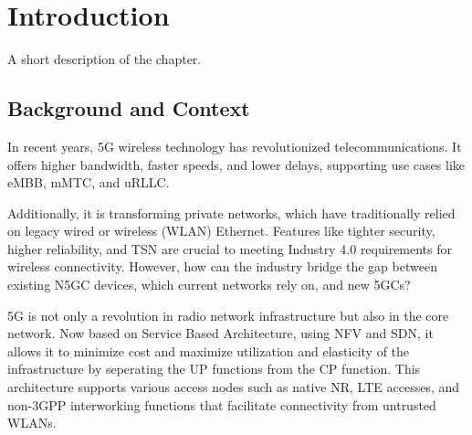 \chapter{Introduction}%
\label{chapter:introduction}

\begin{introduction}
A short description of the chapter.
\end{introduction}

\section{Background and Context}


In recent years, \ac{5G} wireless technology has revolutionized telecommunications. It offers higher bandwidth, faster speeds, and lower delays, supporting use cases like \ac{eMBB}, \ac{mMTC}, and \ac{uRLLC}.

Additionally, it is transforming private networks, which have traditionally relied on legacy wired or wireless (WLAN) Ethernet. Features like tighter security, higher reliability, and \ac{TSN} are crucial to meeting Industry 4.0 requirements for wireless connectivity. However, how can the industry bridge the gap between existing \ac{N5GC} devices, which current networks rely on, and new \acp{5GC}?


5G is not only a revolution in radio network infrastructure but also in the core network. Now based on Service Based Architecture, using \ac{NFV} and \ac{SDN}, it allows it to minimize cost and maximize utilization and elasticity of the infrastructure by seperating the \ac{UP} functions from the \ac{CP} function. This architecture supports various access nodes such as native \ac{NR}, LTE accesses, and non-3GPP interworking functions that facilitate connectivity from untrusted WLANs.~\cite{23.501}


